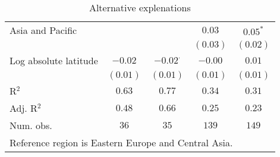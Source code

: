 \begin{table}[H]
\begin{center}
{\begin{tabular}{l c c c c}
Asia and Pacific                  &             &                 & $0.03$         & $0.05^{*}$  \\
                                  &             &                 & $(0.03)$       & $(0.02)$    \\
Log absolute latitude             & $-0.02$     & $-0.02^{\cdot}$ & $-0.00$        & $0.01$      \\
                                  & $(0.01)$    & $(0.01)$        & $(0.01)$       & $(0.01)$    \\
\hline
R$^2$                             & $0.63$      & $0.77$          & $0.34$         & $0.31$      \\
Adj. R$^2$                        & $0.48$      & $0.66$          & $0.25$         & $0.23$      \\
Num. obs.                         & $36$        & $35$            & $139$          & $149$       \\
\hline
\multicolumn{5}{l}{\scriptsize{Reference region is Eastern Europe and Central Asia.}}
\end{tabular}
}
\caption{Alternative explenations}
\label{StateHistoryTable}
\end{center}
\end{table}
